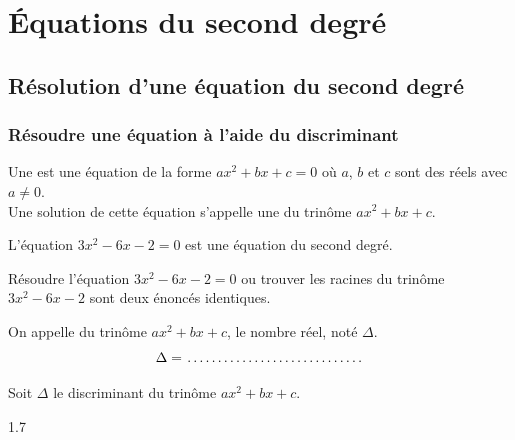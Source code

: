 \chapter{Équations du second degré}
\thispagestyle{fancy}

\section{Résolution d'une équation du second degré}

\subsection{Résoudre une équation à l'aide du discriminant}

    \begin{bdefi}
        Une \pointille[10cm] est une équation de la forme $ax^2+bx+c=0$ où $a$, $b$ et $c$ sont des réels avec $a\neq 0$.\\
        Une solution de cette équation s'appelle une \pointille[4.5cm] du trinôme $ax^2+bx+c$.
    \end{bdefi}
    
    \begin{bexemple}
        L'équation $3x^2-6x-2=0$ est une équation du second degré.
    \end{bexemple}
    
    \begin{brmq}
        Résoudre l'équation $3x^2-6x-2=0$ ou trouver les racines du trinôme $3x^2-6x-2$ sont deux énoncés identiques.
    \end{brmq}
        
    \begin{bdefi}
        On appelle \pointille[4.5cm] du trinôme $ax^2+bx+c$, le nombre réel, noté $\Delta$.
        $$\Delta = \pointille[4.5cm]$$
    \end{bdefi}
        
    \begin{bprop}
        Soit $\Delta$ le discriminant du trinôme $ax^2+bx+c$.\\
        \begin{spacing}{1.7}
        	\begin{itemProp}
        		\item \pointille[\textwidth-1cm]
        		\pointille[\textwidth-1cm]
        		\item \pointille[\textwidth-1cm]
        		\pointille[\textwidth-1cm]
        		\item \pointille[\textwidth-1cm]
        		\pointille[\textwidth-1cm]
        		\pointille[\textwidth-1cm]
        	\end{itemProp}
        \end{spacing}  
    \end{bprop}
        
